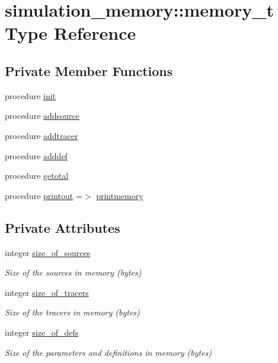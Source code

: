 \hypertarget{structsimulation__memory_1_1memory__t}{}\section{simulation\+\_\+memory\+:\+:memory\+\_\+t Type Reference}
\label{structsimulation__memory_1_1memory__t}
\subsection*{Private Member Functions}
\begin{DoxyCompactItemize}
\item 
procedure \mbox{\hyperlink{structsimulation__memory_1_1memory__t_a328790eca35321a9513f037d86cd91ad}{init}}
\item 
procedure \mbox{\hyperlink{structsimulation__memory_1_1memory__t_a55a678b567d22acf18437743f3afdfdf}{addsource}}
\item 
procedure \mbox{\hyperlink{structsimulation__memory_1_1memory__t_a52610485fd6c793751a506db0ecb3f27}{addtracer}}
\item 
procedure \mbox{\hyperlink{structsimulation__memory_1_1memory__t_a5a231dfd0c9f39ad6c949519ad168f70}{adddef}}
\item 
procedure \mbox{\hyperlink{structsimulation__memory_1_1memory__t_a1677c1871975872cba406a8729fbedb5}{getotal}}
\item 
procedure \mbox{\hyperlink{structsimulation__memory_1_1memory__t_a1972d13f7be392f9ebd5d27e90dfc4e5}{printout}} =$>$ \mbox{\hyperlink{namespacesimulation__memory_a5827bef8479b809a453af147ceaa8c7c}{printmemory}}
\end{DoxyCompactItemize}
\subsection*{Private Attributes}
\begin{DoxyCompactItemize}
\item 
integer \mbox{\hyperlink{structsimulation__memory_1_1memory__t_ad912536f320cd23924d860c4b6810f8a}{size\+\_\+of\+\_\+sources}}
\begin{DoxyCompactList}\small\item\em Size of the sources in memory (bytes) \end{DoxyCompactList}\item 
integer \mbox{\hyperlink{structsimulation__memory_1_1memory__t_aa8a0070dcb1efa0b14a86d40fee9e03d}{size\+\_\+of\+\_\+tracers}}
\begin{DoxyCompactList}\small\item\em Size of the tracers in memory (bytes) \end{DoxyCompactList}\item 
integer \mbox{\hyperlink{structsimulation__memory_1_1memory__t_adba405ad7926a890f3e4feaa9c0cf904}{size\+\_\+of\+\_\+defs}}
\begin{DoxyCompactList}\small\item\em Size of the parameters and definitions in memory (bytes) \end{DoxyCompactList}\end{DoxyCompactItemize}


